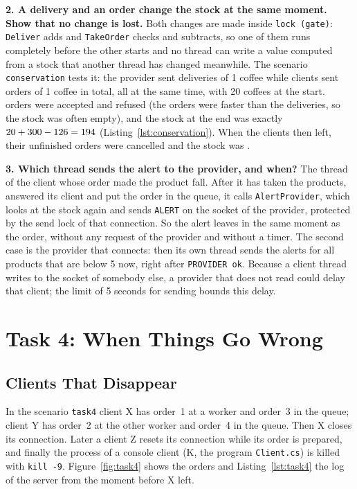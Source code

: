 \documentclass[12pt,a4paper]{article}
\begin{document}
\textbf{2. A delivery and an order change the stock at the same moment. Show that no change is lost.} Both changes are made inside \texttt{lock (gate)}: \texttt{Deliver} adds and \texttt{TakeOrder} checks and subtracts, so one of them runs completely before the other starts and no thread can write a value computed from a stock that another thread has changed meanwhile. The scenario \texttt{conservation} tests it: the provider sent \consDeliveries{} deliveries of 1 coffee while \consClients{} clients sent \consOrders{} orders of 1 coffee in total, all at the same time, with 20 coffees at the start. \consAccepted{} orders were accepted and \consRefused{} refused (the orders were faster than the deliveries, so the stock was often empty), and the stock at the end was exactly $20 + 300 - 126 = 194$ (Listing~\ref{lst:conservation}). When the clients then left, their unfinished orders were cancelled and the stock was \consStockAfter.



\textbf{3. Which thread sends the alert to the provider, and when?} The thread of the client whose order made the product fall. After it has taken the products, answered its client and put the order in the queue, it calls \texttt{AlertProvider}, which looks at the stock again and sends \texttt{ALERT} on the socket of the provider, protected by the send lock of that connection. So the alert leaves in the same moment as the order, without any request of the provider and without a timer. The second case is the provider that connects: then its own thread sends the alerts for all products that are below 5 now, right after \texttt{PROVIDER ok}. Because a client thread writes to the socket of somebody else, a provider that does not read could delay that client; the limit of 5 seconds for sending bounds this delay.

\newpage
\section{Task 4: When Things Go Wrong}
\label{sec:task4}

\subsection{Clients That Disappear}

In the scenario \texttt{task4} client X has order~1 at a worker and order~3 in the queue; client Y has order~2 at the other worker and order~4 in the queue. Then X closes its connection. Later a client Z resets its connection while its order is prepared, and finally the process of a console client (K, the program \texttt{Client.cs}) is killed with \texttt{kill -9}. Figure~\ref{fig:task4} shows the orders and Listing~\ref{lst:task4} the log of the server from the moment before X left.
\end{document}

